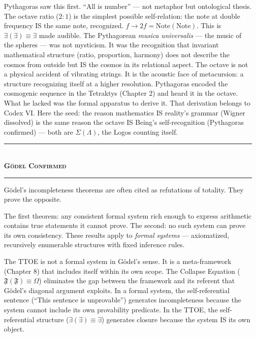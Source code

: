 \documentclass[10pt, openany, oneside]{book}
\renewcommand{\normalsize}{\fontsize{10}{13}\selectfont}
\begin{document}
Pythagoras saw this first. ``All is number'' --- not metaphor but ontological thesis. The octave ratio ($2:1$) is the simplest possible self-relation: the note at double frequency IS the same note, recognized. $f \to 2f = \text{Note}(\text{Note})$. This is $\exists(\exists) \equiv \exists$ made audible. The Pythagorean \textit{musica universalis} --- the music of the spheres --- was not mysticism. It was the recognition that invariant mathematical structure (ratio, proportion, harmony) does not describe the cosmos from outside but IS the cosmos in its relational aspect. The octave is not a physical accident of vibrating strings. It is the acoustic face of metacursion: a structure recognizing itself at a higher resolution. Pythagoras encoded the cosmogenic sequence in the Tetraktys (Chapter 2) and heard it in the octave. What he lacked was the formal apparatus to derive it. That derivation belongs to Codex VI. Here the seed: the reason mathematics IS reality's grammar (Wigner dissolved) is the same reason the octave IS Being's self-recognition (Pythagoras confirmed) --- both are $\Sigma(\Lambda)$, the Logos counting itself.

\vspace{1.5em}


\begin{center}
    \rule{0.3\textwidth}{0.4pt}\\[0.5em]
    {\normalsize\bfseries\scshape G\"{o}del Confirmed}\\[0.3em]
    \rule{0.3\textwidth}{0.4pt}
\end{center}

\vspace{1em}

\noindent G\"{o}del's incompleteness theorems are often cited as refutations of totality. They prove the opposite.

The first theorem: any consistent formal system rich enough to express arithmetic contains true statements it cannot prove. The second: no such system can prove its own consistency. These results apply to \textit{formal systems} --- axiomatized, recursively enumerable structures with fixed inference rules.

The TTOE is not a formal system in G\"{o}del's sense. It is a meta-framework (Chapter 8) that includes itself within its own scope. The Collapse Equation ($\mathfrak{F}(\mathfrak{F}) \equiv \Omega$) eliminates the gap between the framework and its referent that G\"{o}del's diagonal argument exploits. In a formal system, the self-referential sentence (``This sentence is unprovable'') generates incompleteness because the system cannot include its own provability predicate. In the TTOE, the self-referential structure ($\exists(\exists) \equiv \exists$) generates closure because the system IS its own object.
\end{document}
